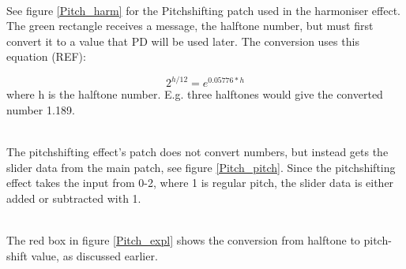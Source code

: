 \begin{minipage}{\linewidth}%
\label{HarmPatch}
\end{minipage}\\

See figure \ref{Pitch_harm} for the Pitchshifting patch used in the harmoniser effect. The green rectangle receives a message, the halftone number, but must first convert it to 
a value that PD will be used later. The conversion uses this equation (REF):

\[ 2^{h/12} = e^{0.05776*h} \] where h is the halftone number. E.g. three halftones would give the converted number 1.189. \\

\begin{minipage}{\linewidth}%
\label{Pitch_harm}
\end{minipage}\\

The pitchshifting effect's patch does not convert numbers, but instead gets the slider data from the main patch, see figure \ref{Pitch_pitch}. Since the pitchshifting effect takes 
the input from 0-2, where 1 is regular pitch, the slider data is either added or subtracted with 1. 

\begin{minipage}{\linewidth}%
\label{Pitch_pitch}
\end{minipage}\\

The red box in figure \ref{Pitch_expl} shows the conversion from halftone to pitch-shift value, as discussed earlier. 

\begin{minipage}{\linewidth}%
\label{Pitch_expl}
\end{minipage}\\

